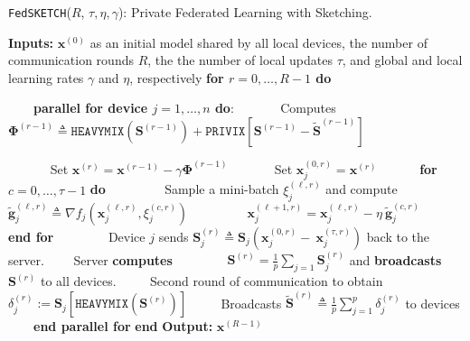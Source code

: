 \begin{algorithm}[H]
\caption{\texttt{FedSKETCH}($R$, $\tau, \eta, \gamma$): Private Federated Learning with Sketching. }\label{Alg:PFLHom}
\begin{algorithmic}[1]
\State \textbf{Inputs:} $\boldsymbol{x}^{(0)}$ as an initial  model shared by all local devices, the number of communication rounds $R$, the the number of local updates $\tau$, and global and local learning rates $\gamma$ and $\eta$, respectively
\State \textbf{for $r=0, \ldots, R-1$ do}

\State $\qquad$\textbf{parallel for device $j=1,\ldots,n$ do}:
\State $\qquad\quad$ Computes ${\mathbf{\Phi}}^{(r-1)}\triangleq \texttt{HEAVYMIX}(\mathbf{S}^{(r-1)})+\texttt{PRIVIX}\left[{\mathbf{S}}^{(r-1)}- \tilde{\mathbf{S}}^{(r-1)}\right]$


\State $\qquad\quad$ Set $\boldsymbol{x}^{(r)}=\boldsymbol{x}^{(r-1)}-\gamma{\mathbf{\Phi}}^{(r-1)}$
\State $\qquad\quad$ Set $\boldsymbol{x}_j^{(0,r)}=\boldsymbol{x}^{(r)}$ 
\State $\qquad\quad $\textbf{for} $c=0,\ldots,\tau-1$ \textbf{do}
\State $\qquad\quad\quad$ Sample a mini-batch $\xi_j^{(\ell,r)}$ and compute $\tilde{\mathbf{g}}_{j}^{(\ell,r)}\triangleq\nabla{f}_j(\boldsymbol{x}^{(\ell,r)}_j,\xi_j^{(c,r)})$
\State $\qquad\quad\quad$ $\boldsymbol{x}^{(\ell+1,r)}_{j}=\boldsymbol{x}^{(\ell,r)}_j-\eta~ \tilde{\mathbf{g}}_{j}^{(c,r)}$ \label{eq:update-rule-alg}
\State $\qquad\quad$\textbf{end for}
\State $\qquad\quad\quad$Device $j$ sends $\mathbf{S}^{(r)}_{j}\triangleq\mathbf{S}_{j}\left(\boldsymbol{x}_j^{(0,r)}-~{\boldsymbol{x}}_{j}^{(\tau,r)}\right)$ back to the server.
\State $\qquad$Server \textbf{computes} 
\State $\qquad\qquad {\mathbf{S}}^{(r)}=\frac{1}{p}\sum_{j=1}\mathbf{S}^{(r)}_{j}$ and \textbf{broadcasts} ${\mathbf{S}}^{(r)}$ to all devices.
\State $\qquad$ Second round of communication to obtain $\delta_j^{(r)} :=  \mathbf{S}_j\left[\texttt{HEAVYMIX}(\mathbf{S}^{(r)})\right]$ 
\State $\qquad$ Broadcasts $\tilde{\mathbf{S}}^{(r)}\triangleq\frac{1}{p}\sum_{j=1}^p\delta_j^{(r)}$ to devices
\State $\qquad$\textbf{end parallel for}
\State \textbf{end}
\State \textbf{Output:} ${\boldsymbol{x}}^{(R-1)}$
\vspace{- 0.1cm}
\end{algorithmic}
\end{algorithm}


